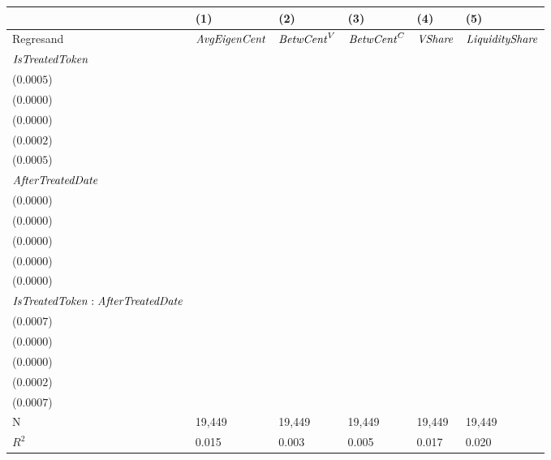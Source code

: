 \begin{tabular}{llllll}
\toprule
{} &                                       (1) &                                      (2) &                                      (3) &                                       (4) &                                      (5) \\
\midrule
Regresand                                     &                      ${\it AvgEigenCent}$ &                       ${\it BetwCent}^V$ &                       ${\it BetwCent}^C$ &                            ${\it VShare}$ &                   ${\it LiquidityShare}$ \\
${\it IsTreatedToken}$                        &   \makecell{$0.0021^{***}$ \\ ($0.0005$)} &     \makecell{$0.0000^{}$ \\ ($0.0000$)} &     \makecell{$0.0000^{}$ \\ ($0.0000$)} &   \makecell{$0.0007^{***}$ \\ ($0.0002$)} &  \makecell{$0.0013^{***}$ \\ ($0.0005$)} \\
${\it AfterTreatedDate}$                      &   \makecell{$0.0007^{***}$ \\ ($0.0000$)} &  \makecell{$0.0000^{***}$ \\ ($0.0000$)} &  \makecell{$0.0000^{***}$ \\ ($0.0000$)} &   \makecell{$0.0003^{***}$ \\ ($0.0000$)} &  \makecell{$0.0009^{***}$ \\ ($0.0000$)} \\
${\it IsTreatedToken}:{\it AfterTreatedDate}$ &  \makecell{$-0.0018^{***}$ \\ ($0.0007$)} &    \makecell{$-0.0000^{}$ \\ ($0.0000$)} &    \makecell{$-0.0000^{}$ \\ ($0.0000$)} &  \makecell{$-0.0006^{***}$ \\ ($0.0002$)} &    \makecell{$-0.0007^{}$ \\ ($0.0007$)} \\
\midrule N                                    &                                    19,449 &                                   19,449 &                                   19,449 &                                    19,449 &                                   19,449 \\
$R^2$                                         &                                     0.015 &                                    0.003 &                                    0.005 &                                     0.017 &                                    0.020 \\
\bottomrule
\end{tabular}
